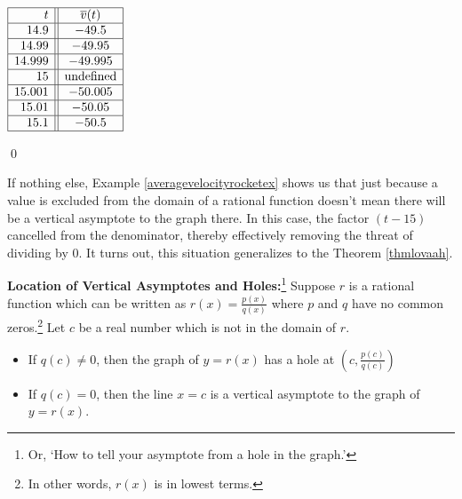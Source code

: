 \begin{ex}
\begin{ex}
\begin{enumerate}
\begin{mtable}
$\begin{array}{|r||c|}  \hline
  t & \overline{v}(t)  \\ \hline
 14.9 & -49.5  \\  \hline
14.99 & -49.95  \\  \hline 
14.999 & -49.995  \\  \hline 
15 & \text{undefined} \\  \hline 
15.001 & -50.005 \\  \hline
15.01 & -50.05 \\  \hline  
15.1 & -50.5 \\  \hline 
  \end{array} $ 

\label{tab:velocitydata}

\end{mtable}

\end{enumerate}

\qed

\end{ex} 

If nothing else, Example \ref{averagevelocityrocketex} shows us that just because a value is excluded from the domain of a rational function doesn't mean there will be a vertical asymptote to the graph there.  In this case, the factor $(t-15)$ cancelled from the denominator, thereby effectively removing the threat of dividing by $0$. It turns out, this situation generalizes to the Theorem \ref{thmlovaah}. 
 
\begin{mthm}
\label{thmlovaah}\textbf{Location of Vertical Asymptotes and Holes:}\footnote{Or, `How to tell your asymptote from a hole in the graph.'}  \label{vavshole}  Suppose $r$ is a rational function which can be written as $r(x) = \frac{p(x)}{q(x)}$ where $p$ and $q$ have no common zeros.\footnote{In other words, $r(x)$ is in lowest terms.}  Let $c$ be a real number which is not in the domain of $r$.   

\begin{itemize}

\item  If $q(c) \neq 0$, then the graph of $y=r(x)$ has a hole at $\left(c, \frac{p(c)}{q(c)}\right)$

\item  If $q(c) = 0$, then the line $x=c$ is a vertical asymptote to the graph of $y=r(x)$.


\end{itemize}
\end{mthm}
\end{ex}
